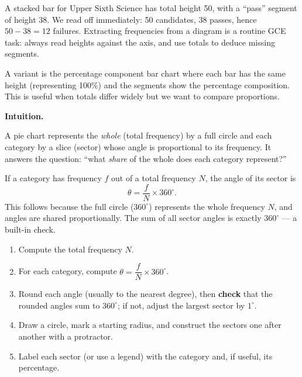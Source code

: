 \documentclass[11pt]{article}
\newcommand{\cle}[1]{{\popxbold\color{popdark}#1}}
\newcounter{popsec}
\newcounter{popsub}
\newcommand{\courssub}[1]{%
  \stepcounter{popsub}%
  \par\vspace{9pt}\noindent{\popxbold\fontsize{11.5}{13}\selectfont\color{popink}{\color{poporange}\thepopsec.\thepopsub}\hspace{6pt}#1}\par\nopagebreak\vspace{4pt}
}
\begin{document}
\begin{exemplebox}
A stacked bar for Upper Sixth Science has total height 50, with a ``pass'' segment of height 38. We read off immediately: 50 candidates, 38 passes, hence $50-38=12$ failures. Extracting frequencies from a diagram is a routine GCE task: always read heights against the axis, and use totals to deduce missing segments.
\end{exemplebox}

\begin{attention}
A variant is the \cle{percentage component bar chart} where each bar has the same height (representing 100\%) and the segments show the percentage composition. This is useful when totals differ widely but we want to compare proportions.
\end{attention}

\courssub{Pie Charts}

\textbf{Intuition.}\par
A pie chart represents the \emph{whole} (total frequency) by a full circle and each category by a slice (sector) whose angle is proportional to its frequency. It answers the question: ``what \emph{share} of the whole does each category represent?''

\begin{propriete}
If a category has frequency $f$ out of a total frequency $N$, the angle of its sector is
\[ \theta = \frac{f}{N}\times 360^{\circ}. \]
This follows because the full circle ($360^{\circ}$) represents the whole frequency $N$, and angles are shared proportionally. The sum of all sector angles is exactly $360^{\circ}$ — a built-in check.
\end{propriete}

\begin{methode}
\begin{enumerate}
\item Compute the total frequency $N$.
\item For each category, compute $\theta=\dfrac{f}{N}\times 360^{\circ}$.
\item Round each angle (usually to the nearest degree), then \textbf{check} that the rounded angles sum to $360^{\circ}$; if not, adjust the largest sector by $1^{\circ}$.
\item Draw a circle, mark a starting radius, and construct the sectors one after another with a protractor.
\item Label each sector (or use a legend) with the category and, if useful, its percentage.
\end{enumerate}
\end{methode}
\end{document}
